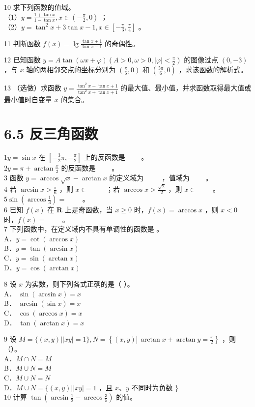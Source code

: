 \documentclass[10pt]{article}
\begin{document}
10 求下列函数的值域。\\
（1）\(y=\frac{1+\tan x}{1-\tan x}, x \in\left(-\frac{\pi}{2}, 0\right)\) ；\\
（2）\(y=\tan ^{2} x+3 \tan x-1, x \in\left[-\frac{\pi}{3}, \frac{\pi}{4}\right]\) 。

11 判断函数 \(f(x)=\lg \frac{\tan x+1}{\tan x-1}\) 的奇偶性。

12 已知函数 \(y=A \tan (\omega x+\varphi)\left(A>0, \omega>0,|\varphi|<\frac{\pi}{2}\right)\) 的图像过点 \((0,-3)\) ，与 \(x\) 轴的两相邻交点的坐标分别为 \(\left(\frac{\pi}{6}, 0\right)\) 和 \(\left(\frac{5 \pi}{6}, 0\right)\) ，求该函数的解析式。

13 （选做）求函数 \(y=\frac{\tan ^{2} x-\tan x+1}{\tan ^{2} x+\tan x+1}\) 的最大值、最小值，并求函数取得最大值或最小值时自变量 \(x\) 的集合。

\section*{6.5 反三角函数}
\(1 y=\sin x\) 在 \(\left[-\frac{3}{2} \pi,-\frac{\pi}{2}\right]\) 上的反函数是 \(\qquad\)。\\
\(2 y=\pi+\arctan \frac{x}{2}\) 的反函数是 \(\qquad\)。\\
3 函数 \(y=\arccos \sqrt{x}-\arctan x\) 的定义域为 \(\qquad\) ，值域为 \(\qquad\)。\\
4 若 \(\arcsin x>\frac{\pi}{6}\) ，则 \(x \in\) \(\qquad\) ；若 \(\arccos x>\frac{\sqrt{2}}{2}\) ，则 \(x \in\) \(\qquad\)。\\
\(5 \sin \left(\arccos \frac{1}{3}\right)=\) \(\qquad\)。\\
6 已知 \(f(x)\) 在 \(\mathbf{R}\) 上是奇函数，当 \(x \geqslant 0\) 时，\(f(x)=\arccos x\) ，则 \(x<0\) 时，\(f(x)=\) \(\qquad\)。\\
7 下列函数中，在定义域内不具有单调性的函数是 。\\
A．\(y=\cot (\arccos x)\)\\
B．\(y=\tan (\arcsin x)\)\\
C．\(y=\sin (\arctan x)\)\\
D．\(y=\cos (\arctan x)\)

8 设 \(x\) 为实数，则下列各式正确的是（ ）。\\
A． \(\sin (\arcsin x)=x\)\\
B． \(\arcsin (\sin x)=x\)\\
C． \(\cos (\arccos x)=x\)\\
D． \(\tan (\arctan x)=x\)

9 设 \(M=\{(x, y)| | x y \mid=1\}, N=\left\{(x, y) \left\lvert\, \arctan x+\arctan y=\frac{\pi}{2}\right.\right\}\) ，则（）。\\
A．\(M \cap N=M\)\\
B．\(M \cup N=M\)\\
C．\(M \cup N=N\)\\
D．\(M \cup N=\{(x, y)| | x y \mid=1\) ，且 \(x 、 y\) 不同时为负数 \(\}\)\\
10 计算 \(\tan \left(\arcsin \frac{1}{2}-\arccos \frac{3}{5}\right)\) 的值。
\end{document}
